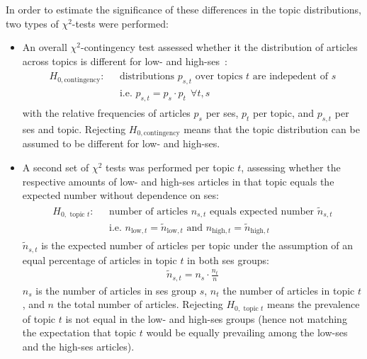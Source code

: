 In order to estimate the significance of these differences in the topic distributions, two types of $\chi^2$-tests were performed:
\begin{itemize}
    \item An overall $\chi^2$-contingency test assessed whether it the distribution of articles across topics is different for low- and high-\gls{ses}~\autocite[p. 430]{fahrmeir_spezielle_2016}:
    \begin{align}
        \begin{split}\label{eq:h0_contingency}
            H_{0, \text{contingency}}: ~~~ &\text{distributions } p_{s, t} \text{ over topics } t \text{ are indepedent of } s\\
        & \text{i.e. } p_{s, t} = p_s \cdot p_t ~~ \forall t, s
        \end{split}
    \end{align}
    with the relative frequencies of articles $p_s$ per \gls{ses}, $p_t$ per topic, and $p_{s, t}$ per \gls{ses} and topic. Rejecting $H_{0, \text{contingency}}$ means that the topic distribution can be assumed to be different for low- and high-\gls{ses}.

    \item A second set of $\chi^2$ tests was performed per topic $t$, assessing whether the respective amounts of low- and high-\gls{ses} articles in that topic equals the expected number without dependence on \gls{ses}:
    \begin{align}
        \begin{split}\label{eq:h0_topic}
            H_{0, \text{ topic }t}: ~~~ &\text{number of articles } n_{s, t} \text{ equals expected number } \tilde n_{s, t} \\
            & \text{i.e. } n_{\text{low}, t} = \tilde n_{\text{low}, t} \text{ and } n_{\text{high}, t} = \tilde n_{\text{high}, t}
        \end{split}
    \end{align}
    $\tilde n_{s, t}$ is the expected number of articles per topic under the assumption of an equal percentage of articles in topic $t$ in both \gls{ses} groups:
    \begin{align}
        \tilde n_{s, t} = n_s \cdot \frac{n_t}{n}
    \end{align}
    $n_s$ is the number of articles in \gls{ses} group $s$, $n_t$ the number of articles in topic $t$, and $n$ the total number of articles. Rejecting $H_{0, \text{ topic }t}$ means the prevalence of topic $t$ is not equal in the low- and high-\gls{ses} groups (hence not matching the expectation that topic $t$ would be equally prevailing among the low-\gls{ses} and the high-\gls{ses} articles).
\end{itemize}

